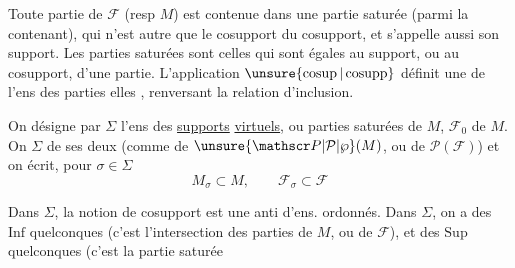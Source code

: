 
Toute partie de $\mathcal F$ (resp $M$) est contenue dans une partie saturée  (parmi  la contenant), qui  n'est autre que le cosupport du cosupport, et s'appelle aussi son support. Les parties saturées sont celles qui sont égales au support, ou au cosupport, d'une partie. L'application  $\unsure{\operatorname{cosup}|\operatorname{cosupp}}$ définit une  de l'ens des parties   elles , renversant la relation d'inclusion.

On désigne par $\Sigma$ l'ens des \uline{supports} \uline{virtuels}, ou parties saturées  de $M$,   $\mathcal F_0$ de $M$.   On  $\Sigma$ de  ses deux  (comme  de $\unsure{\mathscr P|\mathcal P|\wp}(M)$, ou de $\mathscr P(\mathcal F)$) et on écrit, pour $\sigma\in\Sigma$
\[
M_\sigma\subset M,\qquad\mathcal F_\sigma\subset\mathcal F
\]

Dans $\Sigma$,  la notion de cosupport est une anti d'ens. ordonnés. Dans $\Sigma$, on a des $\mathrm{Inf}$ quelconques (c'est l'intersection des parties de $M$, ou de $\mathcal F$), et des $\mathrm{Sup}$ quelconques (c'est la partie saturée
